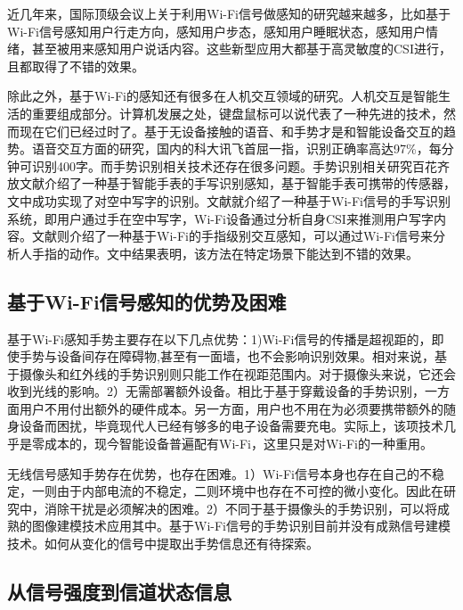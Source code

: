 近几年来，国际顶级会议上关于利用Wi-Fi信号做感知的研究越来越多，比如基于Wi-Fi信号感知用户行走方向，感知用户步态，感知用户睡眠状态，感知用户情绪，甚至被用来感知用户说话内容。这些新型应用大都基于高灵敏度的CSI进行，且都取得了不错的效果。

除此之外，基于Wi-Fi的感知还有很多在人机交互领域的研究。人机交互是智能生活的重要组成部分。计算机发展之处，键盘鼠标可以说代表了一种先进的技术，然而现在它们已经过时了。基于无设备接触的语音、和手势才是和智能设备交互的趋势。语音交互方面的研究，国内的科大讯飞首屈一指，识别正确率高达97\%，每分钟可识别400字。而手势识别相关技术还存在很多问题。手势识别相关研究百花齐放文献\cite{xu2015finger}介绍了一种基于智能手表的手写识别感知，基于智能手表可携带的传感器，文中成功实现了对空中写字的识别。文献\cite{sun2015widraw}就介绍了一种基于Wi-Fi信号的手写识别系统，即用户通过手在空中写字，Wi-Fi设备通过分析自身CSI来推测用户写字内容。文献\cite{li2016wifinger}则介绍了一种基于Wi-Fi的手指级别交互感知，可以通过Wi-Fi信号来分析人手指的动作。文中结果表明，该方法在特定场景下能达到不错的效果。



 \subsection{基于Wi-Fi信号感知的优势及困难}

基于Wi-Fi感知手势主要存在以下几点优势：1)Wi-Fi信号的传播是超视距的，即使手势与设备间存在障碍物,甚至有一面墙，也不会影响识别效果。相对来说，基于摄像头和红外线的手势识别则只能工作在视距范围内。对于摄像头来说，它还会收到光线的影响。2）无需部署额外设备。相比于基于穿戴设备的手势识别，一方面用户不用付出额外的硬件成本。另一方面，用户也不用在为必须要携带额外的随身设备而困扰，毕竟现代人已经有够多的电子设备需要充电。实际上，该项技术几乎是零成本的，现今智能设备普遍配有Wi-Fi，这里只是对Wi-Fi的一种重用。

无线信号感知手势存在优势，也存在困难。1）Wi-Fi信号本身也存在自己的不稳定，一则由于内部电流的不稳定，二则环境中也存在不可控的微小变化。因此在研究中，消除干扰是必须解决的困难。2）不同于基于摄像头的手势识别，可以将成熟的图像建模技术应用其中。基于Wi-Fi信号的手势识别目前并没有成熟信号建模技术。如何从变化的信号中提取出手势信息还有待探索。


\subsection{从信号强度到信道状态信息}


